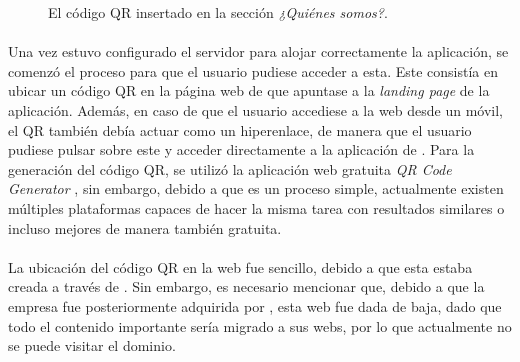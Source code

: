\documentclass{subfiles}
\begin{document}
    \begin{figure}%
    \centering
    \caption{El código QR insertado en la sección \textit{¿Quiénes somos?}.}
    \label{fig:5.1_qr_web}
    \end{figure}

    \paragraph{}
    Una vez estuvo configurado el servidor para alojar correctamente la aplicación, se comenzó el proceso para que el usuario pudiese acceder a esta. Este consistía en ubicar un código QR en la página web de \silverstorm que apuntase a la \textit{landing page} de la aplicación. Además, en caso de que el usuario accediese a la web desde un móvil, el QR también debía actuar como un hiperenlace, de manera que el usuario pudiese pulsar sobre este y acceder directamente a la aplicación de \ra. Para la generación del código QR, se utilizó la aplicación web gratuita \textit{QR Code Generator} \cite{web:qrcodegenerator}, sin embargo, debido a que es un proceso simple, actualmente existen múltiples plataformas capaces de hacer la misma tarea con resultados similares o incluso mejores de manera también gratuita.

    \paragraph{}
    La ubicación del código QR en la web fue sencillo, debido a que esta estaba creada a través de \wordpress. Sin embargo, es necesario mencionar que, debido a que la empresa fue posteriormente adquirida por \thirdera, esta web fue dada de baja, dado que todo el contenido importante sería migrado a sus webs, por lo que actualmente no se puede visitar el dominio.
\end{document}
